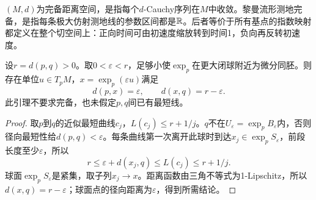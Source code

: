 \begin{definition}[两种完备性]
$(M,d)$为完备距离空间，是指每个$d$-Cauchy序列在$M$中收敛。黎曼流形测地完备，是指每条极大仿射测地线的参数区间都是$\mathbb{R}$。后者等价于所有基点的指数映射都定义在整个切空间上：正向时间可由初速度缩放转到时间1，负向再反转初速度。
\end{definition}

\begin{lemma}[紧小球面上的等号点]\label{lem:hopf-rinow-step}
设$r=d(p,q)>0$。取$0<\varepsilon<r$，足够小使$\exp_p$在更大闭球附近为微分同胚。则存在单位$u\in T_pM$，$x=\exp_p(\varepsilon u)$满足
\[
 d(p,x)=\varepsilon,\qquad d(x,q)=r-\varepsilon.
\]
此引理不要求完备，也未假定$p,q$间已有最短线。
\end{lemma}
\begin{proof}
取$p$到$q$的近似最短曲线$c_j$，$L(c_j)\leq r+1/j$。$q$不在$U_\varepsilon=\exp_pB_\varepsilon$内，否则径向最短性给$d(p,q)<\varepsilon$。每条曲线第一次离开此球时到达$x_j\in\exp_pS_\varepsilon$，前段长度至少$\varepsilon$，所以
\[
 r\leq\varepsilon+d(x_j,q)\leq L(c_j)\leq r+1/j.
\]
球面$\exp_pS_\varepsilon$是紧集，取子列$x_j\to x$。距离函数由三角不等式为1-Lipschitz，所以$d(x,q)=r-\varepsilon$；球面点的径向距离为$\varepsilon$，得到所需结论。
\end{proof}

